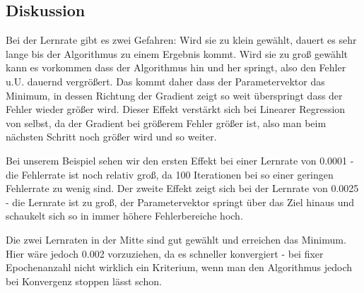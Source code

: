 \documentclass{article}
\begin{document}
\subsection{Diskussion}
Bei der Lernrate gibt es zwei Gefahren: Wird sie zu klein gewählt, dauert es sehr lange bis der Algorithmus zu einem Ergebnis kommt. Wird sie zu groß gewählt kann es vorkommen dass der Algorithmus hin und her springt, also den Fehler u.U. dauernd vergrößert. Das kommt daher dass der Parametervektor das Minimum, in dessen Richtung der Gradient zeigt so weit überspringt dass der Fehler wieder größer wird. Dieser Effekt verstärkt sich bei Linearer Regression von selbst, da der Gradient bei größerem Fehler größer ist, also man beim nächsten Schritt noch größer wird und so weiter.

Bei unserem Beispiel sehen wir den ersten Effekt bei einer Lernrate von 0.0001 - die Fehlerrate ist noch relativ groß, da 100 Iterationen bei so einer geringen Fehlerrate zu wenig sind. Der zweite Effekt zeigt sich bei der Lernrate von 0.0025 - die Lernrate ist zu groß, der Parametervektor springt über das Ziel hinaus und schaukelt sich so in immer höhere Fehlerbereiche hoch.

Die zwei Lernraten in der Mitte sind gut gewählt und erreichen das Minimum. Hier wäre jedoch 0.002 vorzuziehen, da es schneller konvergiert - bei fixer Epochenanzahl nicht wirklich ein Kriterium, wenn man den Algorithmus jedoch bei Konvergenz stoppen lässt schon.
\end{document}
